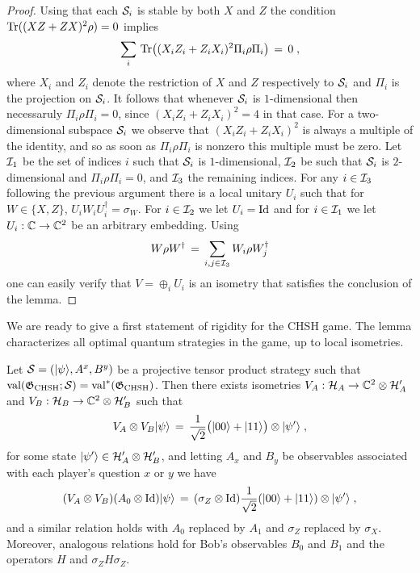 \begin{proof}
Using that  each $\mathcal{S}_i$ is stable by both $X$ and $Z$ the condition $\mathrm{Tr}((XZ+ZX)^2\rho)=0$ implies 
\[ \sum_i \,\mathrm{Tr}\big( (X_iZ_i+Z_iX_i)^2 \Pi_i \rho \Pi_i\big) \,=\,0\;,\]
where $X_i$ and $Z_i$ denote the restriction of $X$ and $Z$ respectively to $\mathcal{S}_i$ and $\Pi_i$ is the projection on $\mathcal{S}_i$. It follows that whenever $\mathcal{S}_i$ is $1$-dimensional then necessaruly $\Pi_i \rho \Pi_i=0$, since $(X_iZ_i+Z_iX_i)^2 = 4$ in that case. For a two-dimensional subspace $\mathcal{S}_i$ we observe that $(X_iZ_i+Z_iX_i)^2$ is always a multiple of the identity, and so as soon as $\Pi_i\rho\Pi_i$ is nonzero this multiple must be zero. Let $\mathcal{I}_1$ be the set of indices $i$ such that $\mathcal{S}_i$ is $1$-dimensional, $\mathcal{I}_2$ be such that $\mathcal{S}_i$ is $2$-dimensional and $\Pi_i\rho\Pi_i= 0$, and $\mathcal{I}_3$ the remaining indices. For any $i\in \mathcal{I}_3$ following the previous argument there is a local unitary $U_i$ such that for $W\in\{X,Z\}$, $U_i W_i U_i^\dagger = \sigma_W$. For $i\in \mathcal{I}_2$ we let $U_i = \mathop{\rm Id}\nolimits$ and for $i\in \mathcal{I}_1$ we let $U_i : \mathbb{C} \to \mathbb{C}^2 $ be an arbitrary embedding. Using 
\[W\rho W^\dagger \,=\, \sum_{i,j\in \mathcal{I}_3} W_i \rho W_j^\dagger \]
one can easily verify that $V = \oplus_i U_i$ is an isometry that satisfies the conclusion of the lemma. 
\end{proof}

We are ready to give a first statement of rigidity for the CHSH game. The lemma characterizes all optimal quantum strategies in the game, up to local isometries. 

\begin{lemma}\label{lemma-rigid-chsh-exact}
Let $\mathcal{S} = (|\psi\rangle,A^x,B^y)$ be a projective tensor product strategy such that $\mathrm{val}(\mathfrak{G}_{\mathrm{CHSH}};\mathcal{S})=\mathrm{val}^*(\mathfrak{G}_{\mathrm{CHSH}})$. Then there exists isometries $V_A:\mathcal{H}_A \to \mathbb{C}^2 \otimes \mathcal{H}'_A$ and $V_B:\mathcal{H}_B \to \mathbb{C}^2 \otimes \mathcal{H}'_B$ such that 
\begin{equation}\label{equation-chsh-state-0}
 V_A \otimes V_B |\psi\rangle \,=\, \frac{1}{\sqrt{2}}\big(|00\rangle+|11\rangle\big) \otimes |\psi'\rangle\;,
\end{equation}
for some state $|\psi'\rangle \in \mathcal{H}'_A \otimes \mathcal{H}'_B$,
and letting $A_x$ and $B_y$ be observables associated with each player's question $x$ or $y$ we have
\begin{equation}\label{equation-chsh-alice-0}
( V_A \otimes V_B)( A_0 \otimes \mathop{\rm Id}\nolimits )|\psi\rangle \,=\, (\sigma_Z \otimes \mathop{\rm Id}\nolimits)\frac{1}{\sqrt{2}}(|00\rangle+|11\rangle) \otimes |\psi'\rangle  \;,
\end{equation}
and a similar relation holds with $A_0$ replaced by $A_1$ and $\sigma_Z$ replaced by $\sigma_X$. Moreover, analogous relations hold for Bob's observables $B_0$ and $B_1$ and the operators $H$ and $\sigma_Z H\sigma_Z$. 
\end{lemma}

